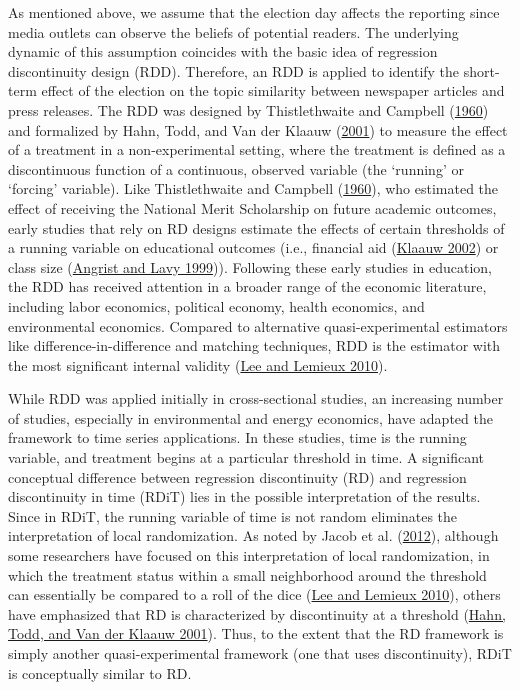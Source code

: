 \documentclass[
  12pt,
]{article}
\begin{document}
As mentioned above, we assume that the election day affects the
reporting since media outlets can observe the beliefs of potential
readers. The underlying dynamic of this assumption coincides with the
basic idea of regression discontinuity design (RDD). Therefore, an RDD
is applied to identify the short-term effect of the election on the
topic similarity between newspaper articles and press releases. The RDD
was designed by Thistlethwaite and Campbell
(\protect\hyperlink{ref-thistlethwaite_regression-discontinuity_1960}{1960})
and formalized by Hahn, Todd, and Van der Klaauw
(\protect\hyperlink{ref-hahn_identification_2001}{2001}) to measure the
effect of a treatment in a non-experimental setting, where the treatment
is defined as a discontinuous function of a continuous, observed
variable (the `running' or `forcing' variable). Like Thistlethwaite and
Campbell
(\protect\hyperlink{ref-thistlethwaite_regression-discontinuity_1960}{1960}),
who estimated the effect of receiving the National Merit Scholarship on
future academic outcomes, early studies that rely on RD designs estimate
the effects of certain thresholds of a running variable on educational
outcomes (i.e., financial aid
(\protect\hyperlink{ref-van_der_klaauw_estimating_2002}{Klaauw 2002}) or
class size (\protect\hyperlink{ref-angrist_using_1999}{Angrist and Lavy
1999})). Following these early studies in education, the RDD has
received attention in a broader range of the economic literature,
including labor economics, political economy, health economics, and
environmental economics. Compared to alternative quasi-experimental
estimators like difference-in-difference and matching techniques, RDD is
the estimator with the most significant internal validity
(\protect\hyperlink{ref-lee_regression_2010}{Lee and Lemieux 2010}).

While RDD was applied initially in cross-sectional studies, an
increasing number of studies, especially in environmental and energy
economics, have adapted the framework to time series applications. In
these studies, time is the running variable, and treatment begins at a
particular threshold in time. A significant conceptual difference
between regression discontinuity (RD) and regression discontinuity in
time (RDiT) lies in the possible interpretation of the results. Since in
RDiT, the running variable of time is not random eliminates the
interpretation of local randomization. As noted by Jacob et al.
(\protect\hyperlink{ref-jacob_practical_2012}{2012}), although some
researchers have focused on this interpretation of local randomization,
in which the treatment status within a small neighborhood around the
threshold can essentially be compared to a roll of the dice
(\protect\hyperlink{ref-lee_regression_2010}{Lee and Lemieux 2010}),
others have emphasized that RD is characterized by discontinuity at a
threshold (\protect\hyperlink{ref-hahn_identification_2001}{Hahn, Todd,
and Van der Klaauw 2001}). Thus, to the extent that the RD framework is
simply another quasi-experimental framework (one that uses
discontinuity), RDiT is conceptually similar to RD.
\end{document}
